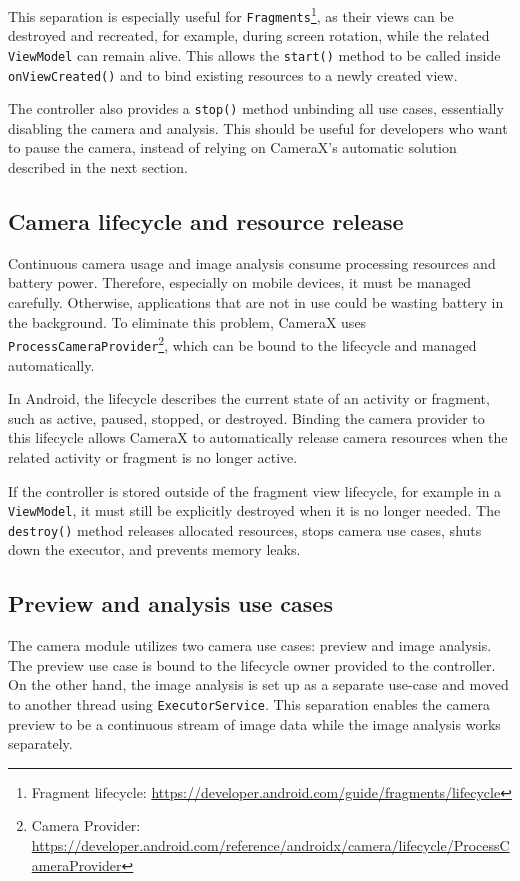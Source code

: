 This separation is especially useful for \texttt{Fragments}\footnote{Fragment lifecycle: \url{https://developer.android.com/guide/fragments/lifecycle}}, as their views can be destroyed and recreated, for example, during screen rotation, while the related \texttt{ViewModel} can remain alive. This allows the \texttt{start()} method to be called inside \texttt{onViewCreated()} and to bind existing resources to a newly created view.

The controller also provides a \texttt{stop()} method unbinding all use cases, essentially disabling the camera and analysis. This should be useful for developers who want to pause the camera, instead of relying on CameraX's automatic solution described in the next section.

\subsection{Camera lifecycle and resource release}
Continuous camera usage and image analysis consume processing resources and battery power. Therefore, especially on mobile devices, it must be managed carefully. Otherwise, applications that are not in use could be wasting battery in the background. To eliminate this problem, CameraX uses \texttt{ProcessCameraProvider}\footnote{Camera Provider: \url{https://developer.android.com/reference/androidx/camera/lifecycle/ProcessCameraProvider}}, which can be bound to the lifecycle and managed automatically.

In Android, the lifecycle describes the current state of an activity or fragment, such as active, paused, stopped, or destroyed. Binding the camera provider to this lifecycle allows CameraX to automatically release camera resources when the related activity or fragment is no longer active.

If the controller is stored outside of the fragment view lifecycle, for example in a \texttt{ViewModel}, it must still be explicitly destroyed when it is no longer needed. The \texttt{destroy()} method releases allocated resources, stops camera use cases, shuts down the executor, and prevents memory leaks.

\subsection{Preview and analysis use cases}
The camera module utilizes two camera use cases: preview and image analysis. The preview use case is bound to the lifecycle owner provided to the controller. On the other hand, the image analysis is set up as a separate use-case and moved to another thread using \texttt{ExecutorService}. This separation enables the camera preview to be a continuous stream of image data while the image analysis works separately.

